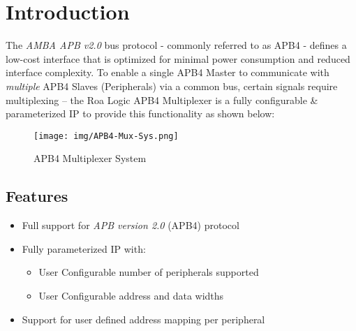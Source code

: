 \chapter{Introduction}\label{introduction}

The \emph{AMBA APB v2.0} bus protocol - commonly referred to as APB4 - 
defines a low-cost interface that is optimized for minimal power
consumption and reduced interface complexity. To enable a single APB4
Master to communicate with \emph{multiple} APB4 Slaves (Peripherals) via
a common bus, certain signals require multiplexing -- the Roa Logic APB4
Multiplexer is a fully configurable \& parameterized IP to provide this
functionality as shown below:

\begin{figure}[th]
	\centering
	\texttt{[image: img/APB4-Mux-Sys.png]}
	\caption{APB4 Multiplexer System}
	\label{fig:apb4-mux-sys}
\end{figure}

\section{Features}\label{features}

\begin{itemize}
\item
  Full support for \emph{APB version 2.0} (APB4) protocol
\item
  Fully parameterized IP with:
  \begin{itemize}
  \item
    User Configurable number of peripherals supported
  \item
    User Configurable address and data widths
  \end{itemize}
\item
  Support for user defined address mapping per peripheral
\end{itemize}